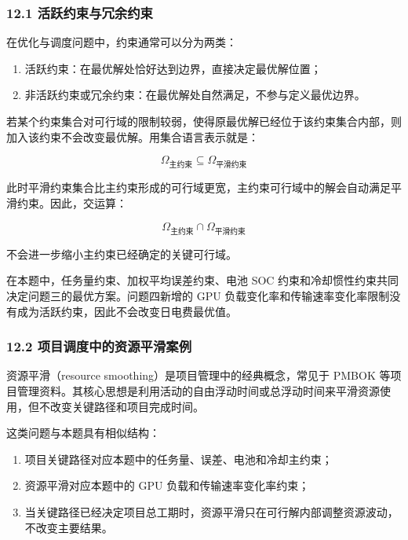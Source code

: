 \documentclass[
]{article}
\begin{document}
\subsubsection{12.1
活跃约束与冗余约束}\label{121-ux6d3bux8dc3ux7ea6ux675fux4e0eux5197ux4f59ux7ea6ux675f}

在优化与调度问题中，约束通常可以分为两类：

\begin{enumerate}
\def\labelenumi{\arabic{enumi}.}
\item
  活跃约束：在最优解处恰好达到边界，直接决定最优解位置；
\item
  非活跃约束或冗余约束：在最优解处自然满足，不参与定义最优边界。
\end{enumerate}

若某个约束集合对可行域的限制较弱，使得原最优解已经位于该约束集合内部，则加入该约束不会改变最优解。用集合语言表示就是：

\[\Omega_{\text{主约束}}\subseteq \Omega_{\text{平滑约束}}\]

此时平滑约束集合比主约束形成的可行域更宽，主约束可行域中的解会自动满足平滑约束。因此，交运算：

\[\Omega_{\text{主约束}}\cap\Omega_{\text{平滑约束}}\]

不会进一步缩小主约束已经确定的关键可行域。

在本题中，任务量约束、加权平均误差约束、电池 SOC
约束和冷却惯性约束共同决定问题三的最优方案。问题四新增的 GPU
负载变化率和传输速率变化率限制没有成为活跃约束，因此不会改变日电费最优值。

\subsubsection{12.2
项目调度中的资源平滑案例}\label{122-ux9879ux76eeux8c03ux5ea6ux4e2dux7684ux8d44ux6e90ux5e73ux6ed1ux6848ux4f8b}

资源平滑（resource smoothing）是项目管理中的经典概念，常见于 PMBOK
等项目管理资料。其核心思想是利用活动的自由浮动时间或总浮动时间来平滑资源使用，但不改变关键路径和项目完成时间。

这类问题与本题具有相似结构：

\begin{enumerate}
\def\labelenumi{\arabic{enumi}.}
\item
  项目关键路径对应本题中的任务量、误差、电池和冷却主约束；
\item
  资源平滑对应本题中的 GPU 负载和传输速率变化率约束；
\item
  当关键路径已经决定项目总工期时，资源平滑只在可行解内部调整资源波动，不改变主要结果。
\end{enumerate}
\end{document}
